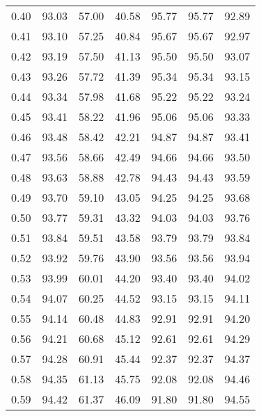 \begin{tabular}{|c|c|c|c|c|c|c|}
      0.40 &     93.03 &     57.00 &      40.58 &   95.77 &      95.77 &         92.89 \\
      0.41 &     93.10 &     57.25 &      40.84 &   95.67 &      95.67 &         92.97 \\
      0.42 &     93.19 &     57.50 &      41.13 &   95.50 &      95.50 &         93.07 \\
      0.43 &     93.26 &     57.72 &      41.39 &   95.34 &      95.34 &         93.15 \\
      0.44 &     93.34 &     57.98 &      41.68 &   95.22 &      95.22 &         93.24 \\
      0.45 &     93.41 &     58.22 &      41.96 &   95.06 &      95.06 &         93.33 \\
      0.46 &     93.48 &     58.42 &      42.21 &   94.87 &      94.87 &         93.41 \\
      0.47 &     93.56 &     58.66 &      42.49 &   94.66 &      94.66 &         93.50 \\
      0.48 &     93.63 &     58.88 &      42.78 &   94.43 &      94.43 &         93.59 \\
      0.49 &     93.70 &     59.10 &      43.05 &   94.25 &      94.25 &         93.68 \\
      0.50 &     93.77 &     59.31 &      43.32 &   94.03 &      94.03 &         93.76 \\
      0.51 &     93.84 &     59.51 &      43.58 &   93.79 &      93.79 &         93.84 \\
      0.52 &     93.92 &     59.76 &      43.90 &   93.56 &      93.56 &         93.94 \\
      0.53 &     93.99 &     60.01 &      44.20 &   93.40 &      93.40 &         94.02 \\
      0.54 &     94.07 &     60.25 &      44.52 &   93.15 &      93.15 &         94.11 \\
      0.55 &     94.14 &     60.48 &      44.83 &   92.91 &      92.91 &         94.20 \\
      0.56 &     94.21 &     60.68 &      45.12 &   92.61 &      92.61 &         94.29 \\
      0.57 &     94.28 &     60.91 &      45.44 &   92.37 &      92.37 &         94.37 \\
      0.58 &     94.35 &     61.13 &      45.75 &   92.08 &      92.08 &         94.46 \\
      0.59 &     94.42 &     61.37 &      46.09 &   91.80 &      91.80 &         94.55 \\

\end{tabular}
